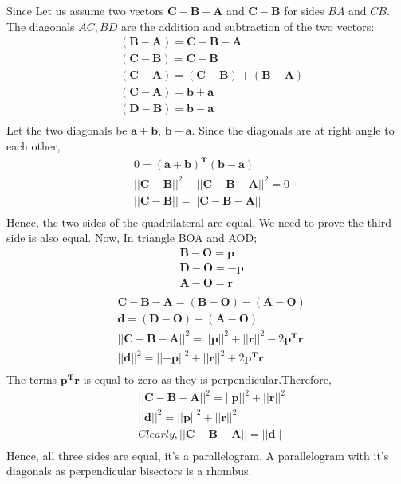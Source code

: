 \documentclass[a4paper,12pt,twocolumn]{article}
\let\vec\mathbf
\begin{document}
Since
Let us assume two vectors $\vec{C}-\vec{B}-\vec{A}$ and $\vec{C}-\vec{B}$ for sides $BA$ and $CB$. The diagonals $AC,BD$ are the addition and subtraction of the two vectors:
\begin{align}
	&\vec{(B-A)} = \vec{C}-\vec{B}-\vec{A}\\
	&\vec{(C-B)} = \vec{C}-\vec{B}\\
	&\vec{(C-A)} = \vec{(C-B)} +\vec{(B-A)}\\
	&\vec{(C-A)} = \vec{b+a}\\
	&\vec{(D-B)} = \vec{b-a}\\
\end{align}
Let the two diagonals be $\vec{a+b}$, $\vec{b-a}$. Since the diagonals are at right angle to each other,
\begin{align}
&0 = \vec{(a+b)^T}\vec{(b-a)}\\	
&||\vec{C}-\vec{B}||^2 - ||\vec{C}-\vec{B}-\vec{A}||^2 = 0\\
&||\vec{C}-\vec{B}|| = ||\vec{C}-\vec{B}-\vec{A}||\\
\end{align}
Hence, the two sides of the quadrilateral are equal. We need to prove the third side is also equal.
Now,
In triangle BOA and AOD;
\begin{align}
	&\vec{B-O} = \vec{p}\\
	&\vec{D-O} = \vec{-p}\\
	&\vec{A-O} = \vec{r}\\
\end{align}
\begin{align}
	&\vec{C}-\vec{B}-\vec{A} = \vec{(B-O)} - \vec{(A-O)}\\ 
	&\vec{d} = \vec{(D-O)} - \vec{(A-O)}\\
&||\vec{C}-\vec{B}-\vec{A}||^2 = ||\vec{p}||^2 + ||\vec{r}||^2 - 2\vec{p^Tr}\\
&||\vec{d}||^2 = ||\vec{-p}||^2 + ||\vec{r}||^2 + 2\vec{p^Tr}\\
\end{align}
The terms $\vec{p^Tr}$ is equal to zero as they is perpendicular.Therefore,
\begin{align}
	&||\vec{C}-\vec{B}-\vec{A}||^2 = ||\vec{p}||^2 + ||\vec{r}||^2\\
	&||\vec{d}||^2 = ||\vec{p}||^2 + ||\vec{r}||^2\\
	&Clearly, ||\vec{C}-\vec{B}-\vec{A}|| = ||\vec{d}||\\
\end{align}
Hence, all three sides are equal, it's a parallelogram. A parallelogram with it's diagonals as perpendicular bisectors is a rhombus.
\fi
\iffalse
\end{document}

